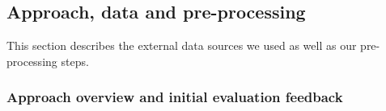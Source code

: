\subsection{Approach, data and pre-processing}
\label{sec:overview}
This section describes the external data sources we used as well as our pre-processing steps.



\subsubsection{Approach overview and initial evaluation feedback}
\label{sec:approach_feedback}






